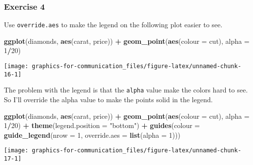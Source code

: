 \documentclass[]{book}
\newenvironment{Shaded}{\begin{snugshade}}{\end{snugshade}}
\newcommand{\DataTypeTok}[1]{\textcolor[rgb]{0.13,0.29,0.53}{#1}}
\newcommand{\DecValTok}[1]{\textcolor[rgb]{0.00,0.00,0.81}{#1}}
\newcommand{\KeywordTok}[1]{\textcolor[rgb]{0.13,0.29,0.53}{\textbf{#1}}}
\newcommand{\NormalTok}[1]{#1}
\newcommand{\OperatorTok}[1]{\textcolor[rgb]{0.81,0.36,0.00}{\textbf{#1}}}
\newcommand{\StringTok}[1]{\textcolor[rgb]{0.31,0.60,0.02}{#1}}
\theoremstyle{plain}
\theoremstyle{remark}
\theoremstyle{definition}
\theoremstyle{definition}
\theoremstyle{definition}
\theoremstyle{remark}
\begin{document}
\hypertarget{exercise-4-43}{%
\subsubsection{Exercise 4}\label{exercise-4-43}}

Use \texttt{override.aes} to make the legend on the following plot
easier to see.

\begin{Shaded}
\begin{Highlighting}[]
\KeywordTok{ggplot}\NormalTok{(diamonds, }\KeywordTok{aes}\NormalTok{(carat, price)) }\OperatorTok{+}
\StringTok{  }\KeywordTok{geom_point}\NormalTok{(}\KeywordTok{aes}\NormalTok{(}\DataTypeTok{colour =}\NormalTok{ cut), }\DataTypeTok{alpha =} \DecValTok{1}\OperatorTok{/}\DecValTok{20}\NormalTok{)}
\end{Highlighting}
\end{Shaded}

\begin{center}\texttt{[image: graphics-for-communication\_files/figure-latex/unnamed-chunk-16-1]} \end{center}

The problem with the legend is that the \texttt{alpha} value make the
colors hard to see. So I'll override the alpha value to make the points
solid in the legend.

\begin{Shaded}
\begin{Highlighting}[]
\KeywordTok{ggplot}\NormalTok{(diamonds, }\KeywordTok{aes}\NormalTok{(carat, price)) }\OperatorTok{+}
\StringTok{  }\KeywordTok{geom_point}\NormalTok{(}\KeywordTok{aes}\NormalTok{(}\DataTypeTok{colour =}\NormalTok{ cut), }\DataTypeTok{alpha =} \DecValTok{1}\OperatorTok{/}\DecValTok{20}\NormalTok{)  }\OperatorTok{+}
\StringTok{  }\KeywordTok{theme}\NormalTok{(}\DataTypeTok{legend.position =} \StringTok{"bottom"}\NormalTok{) }\OperatorTok{+}
\StringTok{  }\KeywordTok{guides}\NormalTok{(}\DataTypeTok{colour =} \KeywordTok{guide_legend}\NormalTok{(}\DataTypeTok{nrow =} \DecValTok{1}\NormalTok{, }\DataTypeTok{override.aes =} \KeywordTok{list}\NormalTok{(}\DataTypeTok{alpha =} \DecValTok{1}\NormalTok{)))  }
\end{Highlighting}
\end{Shaded}

\begin{center}\texttt{[image: graphics-for-communication\_files/figure-latex/unnamed-chunk-17-1]} \end{center}
\end{document}
